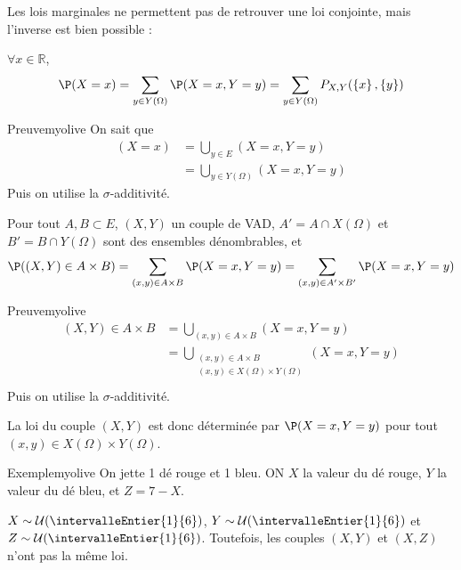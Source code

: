    Les lois marginales ne permettent pas de retrouver une loi conjointe, mais l’inverse est bien possible :

    \begin{prop}{}{}
        $\forall x \in \mathbb{R}$, 
        \[ \P(X = x) = \sum_{y \in Y(\Omega)} \P(X = x,Y = y) = \sum_{y \in Y(\Omega)} P_{X,Y} (\left\{x\right\}, \left\{y\right\}) \] 
    \end{prop}

    \begin{demo}{Preuve}{myolive}
        On sait que 
        \begin{align*}
            (X = x) &= \bigcup_{y \in E} (X = x, Y = y) \\
            &= \bigcup_{y \in Y(\Omega)} (X = x, Y = y)
        \end{align*}
        Puis on utilise la $\sigma$-additivité.
    \end{demo}

    \begin{prop}{}{}
        Pour tout $A,B \subset E$, $(X,Y)$ un couple de VAD, $A' = A \cap X(\Omega)$ et $B' = B \cap Y(\Omega)$ sont des ensembles dénombrables, et 
        \[ \P((X,Y) \in A \times B) = \sum_{(x,y) \in A \times B} \P(X=x,Y=y) = \sum_{(x,y) \in A'\times B'} \P(X=x,Y=y) \]   
    \end{prop}

    \begin{demo}{Preuve}{myolive}
        \begin{align*}
            (X,Y) \in A \times B &= \bigcup_{(x,y) \in A \times B} (X = x, Y = y) \\
            &= \bigcup_{\substack{(x,y) \in A \times B \\ (x,y) \in X(\Omega) \times Y(\Omega)}} (X = x, Y = y) \\
        \end{align*}
        Puis on utilise la $\sigma$-additivité.
    \end{demo}

    La loi du couple $(X,Y)$ est donc déterminée par $\P(X=x,Y=y)$ pour tout $(x,y) \in X(\Omega) \times Y(\Omega)$.

    \begin{omed}{Exemple}{myolive}
        On jette 1 dé rouge et 1 bleu. ON $X$ la valeur du dé rouge, $Y$ la valeur du dé bleu, et $Z = 7 - X$. 

        $X \sim \mathcal{U}(\intervalleEntier{1}{6})$, $Y \sim \mathcal{U}(\intervalleEntier{1}{6})$ et $Z \sim \mathcal{U}(\intervalleEntier{1}{6})$. Toutefois, les couples $(X,Y)$ et $(X,Z)$ n’ont pas la même loi.
    \end{omed}

